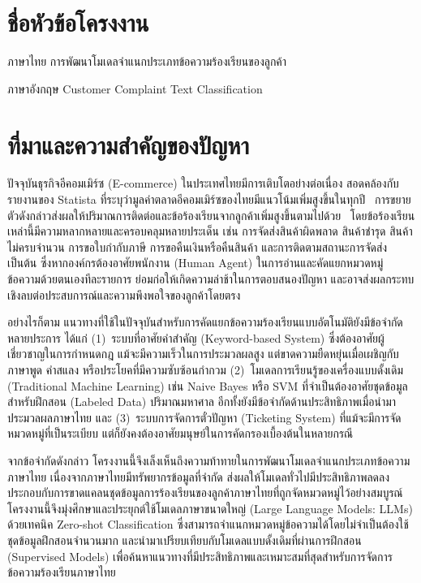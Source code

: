 
\section{ชื่อหัวข้อโครงงาน}

ภาษาไทย การพัฒนาโมเดลจำแนกประเภทข้อความร้องเรียนของลูกค้า

ภาษาอังกฤษ Customer Complaint Text Classification

\section{ที่มาและความสำคัญของปัญหา}

ปัจจุบันธุรกิจอีคอมเมิร์ซ (E-commerce) ในประเทศไทยมีการเติบโตอย่างต่อเนื่อง สอดคล้องกับรายงานของ Statista ที่ระบุว่ามูลค่าตลาดอีคอมเมิร์ซของไทยมีแนวโน้มเพิ่มสูงขึ้นในทุกปี~\cite{statista2024ecommerce} การขยายตัวดังกล่าวส่งผลให้ปริมาณการติดต่อและข้อร้องเรียนจากลูกค้าเพิ่มสูงขึ้นตามไปด้วย~\cite{roumeliotis2025think} โดยข้อร้องเรียนเหล่านี้มีความหลากหลายและครอบคลุมหลายประเด็น เช่น การจัดส่งสินค้าผิดพลาด สินค้าชำรุด สินค้าไม่ครบจำนวน การขอใบกำกับภาษี การขอคืนเงินหรือคืนสินค้า และการติดตามสถานะการจัดส่ง เป็นต้น ซึ่งหากองค์กรต้องอาศัยพนักงาน (Human Agent) ในการอ่านและคัดแยกหมวดหมู่ข้อความด้วยตนเองทีละรายการ ย่อมก่อให้เกิดความล่าช้าในการตอบสนองปัญหา และอาจส่งผลกระทบเชิงลบต่อประสบการณ์และความพึงพอใจของลูกค้าโดยตรง

อย่างไรก็ตาม แนวทางที่ใช้ในปัจจุบันสำหรับการคัดแยกข้อความร้องเรียนแบบอัตโนมัติยังมีข้อจำกัดหลายประการ ได้แก่ (1)~ระบบที่อาศัยคำสำคัญ (Keyword-based System) ซึ่งต้องอาศัยผู้เชี่ยวชาญในการกำหนดกฎ แม้จะมีความเร็วในการประมวลผลสูง แต่ขาดความยืดหยุ่นเมื่อเผชิญกับภาษาพูด คำสแลง หรือประโยคที่มีความซับซ้อนกำกวม (2)~โมเดลการเรียนรู้ของเครื่องแบบดั้งเดิม (Traditional Machine Learning) เช่น Naive Bayes หรือ SVM ที่จำเป็นต้องอาศัยชุดข้อมูลสำหรับฝึกสอน (Labeled Data) ปริมาณมหาศาล อีกทั้งยังมีข้อจำกัดด้านประสิทธิภาพเมื่อนำมาประมวลผลภาษาไทย และ (3)~ระบบการจัดการตั๋วปัญหา (Ticketing System) ที่แม้จะมีการจัดหมวดหมู่ที่เป็นระเบียบ แต่ก็ยังคงต้องอาศัยมนุษย์ในการคัดกรองเบื้องต้นในหลายกรณี

จากข้อจำกัดดังกล่าว โครงงานนี้จึงเล็งเห็นถึงความท้าทายในการพัฒนาโมเดลจำแนกประเภทข้อความภาษาไทย เนื่องจากภาษาไทยมีทรัพยากรข้อมูลที่จำกัด ส่งผลให้โมเดลทั่วไปมีประสิทธิภาพลดลง~\cite{sriphon2025} ประกอบกับการขาดแคลนชุดข้อมูลการร้องเรียนของลูกค้าภาษาไทยที่ถูกจัดหมวดหมู่ไว้อย่างสมบูรณ์ โครงงานนี้จึงมุ่งศึกษาและประยุกต์ใช้โมเดลภาษาขนาดใหญ่ (Large Language Models: LLMs) ด้วยเทคนิค Zero-shot Classification ซึ่งสามารถจำแนกหมวดหมู่ข้อความได้โดยไม่จำเป็นต้องใช้ชุดข้อมูลฝึกสอนจำนวนมาก และนำมาเปรียบเทียบกับโมเดลแบบดั้งเดิมที่ผ่านการฝึกสอน (Supervised Models) เพื่อค้นหาแนวทางที่มีประสิทธิภาพและเหมาะสมที่สุดสำหรับการจัดการข้อความร้องเรียนภาษาไทย


